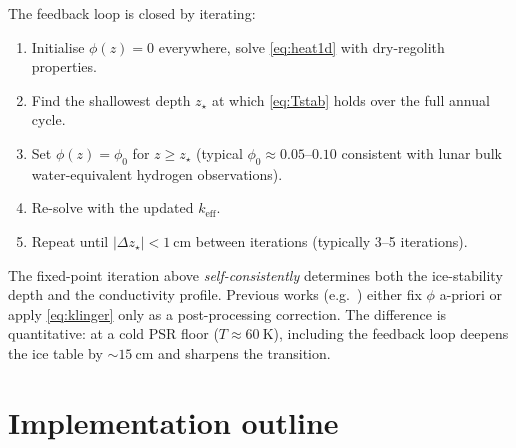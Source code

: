 The feedback loop is closed by iterating:
\begin{enumerate}
  \item Initialise $\phi(z) = 0$ everywhere, solve \cref{eq:heat1d}
        with dry-regolith properties.
  \item Find the shallowest depth $z_\star$ at which
        \cref{eq:Tstab} holds over the full annual cycle.
  \item Set $\phi(z) = \phi_0$ for $z \ge z_\star$ (typical
        $\phi_0\approx 0.05$--$0.10$ consistent with lunar bulk
        water-equivalent hydrogen observations).
  \item Re-solve with the updated $k_{\mathrm{eff}}$.
  \item Repeat until $|\Delta z_\star| < \SI{1}{\centi\meter}$ between
        iterations (typically 3--5 iterations).
\end{enumerate}

\begin{novelty}
The fixed-point iteration above \emph{self-consistently} determines
both the ice-stability depth and the conductivity profile.  Previous
works (e.g.\ \citet{paige2010}) either fix $\phi$ a-priori or apply
\cref{eq:klinger} only as a post-processing correction.  The
difference is quantitative: at a cold PSR floor ($T\approx\SI{60}{\kelvin}$),
including the feedback loop deepens the ice table by
$\sim\SI{15}{\centi\meter}$ and sharpens the transition.
\end{novelty}

\section{Implementation outline}


